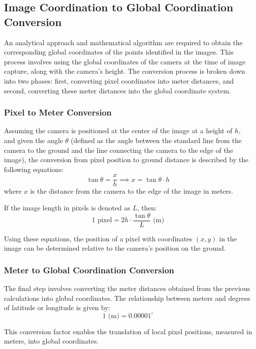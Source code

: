 \documentclass[conference]{IEEEtran}
\begin{document}
\subsection{Image Coordination to Global Coordination Conversion}
An analytical approach and mathematical algorithm are required to obtain the corresponding global coordinates of the points identified in the images. This process involves using the global coordinates of the camera at the time of image capture, along with the camera's height. The conversion process is broken down into two phases: first, converting pixel coordinates into meter distances, and second, converting these meter distances into the global coordinate system.

\subsubsection{Pixel to Meter Conversion}
Assuming the camera is positioned at the center of the image at a height of \( h \), and given the angle \( \theta \) (defined as the angle between the standard line from the camera to the ground and the line connecting the camera to the edge of the image), the conversion from pixel position to ground distance is described by the following equations:
\[
\tan \theta = \frac{x}{h} \implies x = \tan \theta  \cdot h
\]
where \( x \) is the distance from the camera to the edge of the image in meters.

If the image length in pixels is denoted as \( L \), then:
\[
1 \text{ pixel} = 2h \cdot \frac{\tan \theta}{L} \text{ (m)}
\]

Using these equations, the position of a pixel with coordinates \((x, y)\) in the image can be determined relative to the camera's position on the ground.

\subsubsection{Meter to Global Coordination Conversion}
The final step involves converting the meter distances obtained from the previous calculations into global coordinates. The relationship between meters and degrees of latitude or longitude is given by:
\[
1 \text{ (m)} = 0.00001^\circ
\]

This conversion factor enables the translation of local pixel positions, measured in meters, into global coordinates.
\end{document}
